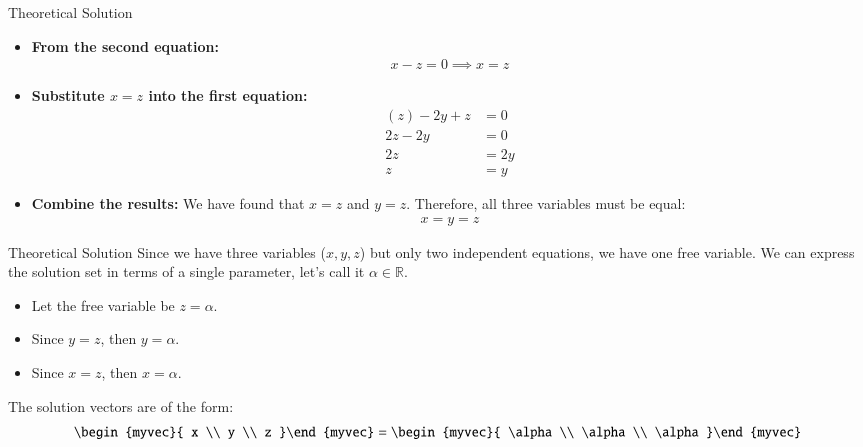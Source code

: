\documentclass{beamer}
\begin{document}
\begin{frame}{Theoretical Solution}
\begin{itemize}
    \item \textbf{From the second equation:}
    \begin{align}
    x - z = 0 \implies x = z
    \end{align}
    
    \item \textbf{Substitute $x = z$ into the first equation:}
    \begin{align}
        (z) - 2y + z &= 0 \\
        2z - 2y &= 0 \\
        2z &= 2y \\
        z &= y
    \end{align}
    
    \item \textbf{Combine the results:}
    We have found that $x = z$ and $y = z$. Therefore, all three variables must be equal:
    \begin{align}
    x = y = z
    \end{align}
\end{itemize}
\end{frame}

\begin{frame}{Theoretical Solution}
Since we have three variables ($x, y, z$) but only two independent equations, we have one free variable. We can express the solution set in terms of a single parameter, let's call it $\alpha \in \mathbb{R}$.

\begin{itemize}
    \item Let the free variable be $z = \alpha$.
    \item Since $y = z$, then $y = \alpha$.
    \item Since $x = z$, then $x = \alpha$.
\end{itemize}

The solution vectors are of the form:
\begin{align}
\begin{myvec}{ x \\ y \\ z }\end{myvec} = 
\begin{myvec}{ \alpha \\ \alpha \\ \alpha }\end{myvec}
\end{align}
\end{frame}
\end{document}

